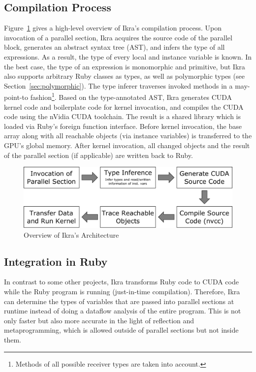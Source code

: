 \documentclass[preprint]{sigplanconf}
\begin{document}
\subsection{Compilation Process}
Figure~\ref{fig:overview_arch} gives a high-level overview of Ikra's compilation process. Upon invocation of a parallel section, Ikra acquires the source code of the parallel block, generates an abstract syntax tree (AST), and infers the type of all expressions. As a result, the type of every local and instance variable is known. In the best case, the type of an expression is monomorphic and primitive, but Ikra also supports arbitrary Ruby classes as types, as well as polymorphic types (see Section~\ref{sec:polymorphic}). The type inferer traverses invoked methods in a may-point-to fashion\footnote{Methods of all possible receiver types are taken into account.}. Based on the type-annotated AST, Ikra generates CUDA kernel code and boilerplate code for kernel invocation, and compiles the CUDA code using the nVidia CUDA toolchain. The result is a shared library which is loaded via Ruby's foreign function interface. Before kernel invocation, the base array along with all reachable objects (via instance variables) is transferred to the GPU's global memory. After kernel invocation, all changed objects and the result of the parallel section (if applicable) are written back to Ruby.

\begin{figure}[!htp]
    \includegraphics[width=\columnwidth]{high_level_arch.pdf}
    \caption{Overview of Ikra's Architecture}
    \label{fig:overview_arch}
\end{figure}

\subsection{Integration in Ruby}
In contrast to some other projects, Ikra transforms Ruby code to CUDA code while the Ruby program is running (just-in-time compilation). Therefore, Ikra can determine the types of variables that are passed into parallel sections at runtime instead of doing a dataflow analysis of the entire program. This is not only faster but also more accurate in the light of reflection and metaprogramming, which is allowed outside of parallel sections but not inside them.
\end{document}
